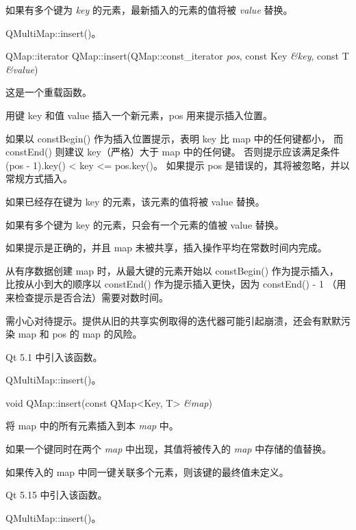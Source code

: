 如果有多个键为 \emph{key} 的元素，最新插入的元素的值将被 \emph{value} 替换。

\begin{seeAlso}
QMultiMap::insert()。
\end{seeAlso}

\splitLine

QMap::iterator QMap::insert(QMap::const\_iterator \emph{pos}, const Key \emph{\&key}, const T \emph{\&value})

这是一个重载函数。

用键 key 和值 value 插入一个新元素，pos 用来提示插入位置。

如果以 constBegin() 作为插入位置提示，表明 key 比 map 中的任何键都小，
而 constEnd() 则建议 key（严格）大于 map 中的任何键。
否则提示应该满足条件 (pos - 1).key() < key <= pos.key()。
如果提示 pos 是错误的，其将被忽略，并以常规方式插入。

如果已经存在键为 key 的元素，该元素的值将被 value 替换。

如果有多个键为 key 的元素，只会有一个元素的值被 value 替换。

如果提示是正确的，并且 map 未被共享，插入操作平均在常数时间内完成。

从有序数据创建 map 时，从最大键的元素开始以 constBegin() 作为提示插入，
比按从小到大的顺序以 constEnd() 作为提示插入更快，因为 constEnd() - 1 （用来检查提示是否合法）需要对数时间。

\begin{notice}
需小心对待提示。提供从旧的共享实例取得的迭代器可能引起崩溃，还会有默默污染 map 和 pos 的 map 的风险。
\end{notice}

Qt 5.1 中引入该函数。

\begin{seeAlso}
QMultiMap::insert()。
\end{seeAlso}

\splitLine

void QMap::insert(const QMap<Key, T> \emph{\&map})

将 map 中的所有元素插入到本 \emph{map} 中。

如果一个键同时在两个 \emph{map} 中出现，其值将被传入的 \emph{map} 中存储的值替换。

\begin{seeAlso}
如果传入的 map 中同一键关联多个元素，则该键的最终值未定义。
\end{seeAlso}

Qt 5.15 中引入该函数。

\begin{seeAlso}
QMultiMap::insert()。
\end{seeAlso}

